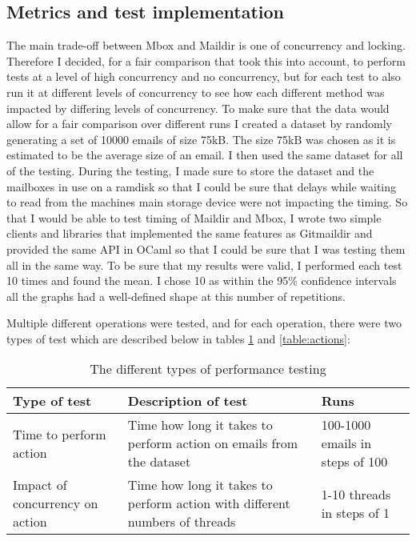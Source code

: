 \subsection{Metrics and test implementation}

The main trade-off between Mbox and Maildir is one of concurrency and locking. Therefore I decided, for a fair comparison that took this into account, to perform tests at a level of high concurrency and no concurrency, but for each test to also run it at different levels of concurrency to see how each different method was impacted by differing levels of concurrency. To make sure that the data would allow for a fair comparison over different runs I created a dataset by randomly generating a set of 10000 emails of size 75kB. The size 75kB was chosen as it is estimated to be the average size of an email\cite{email_size}. I then used the same dataset for all of the testing. During the testing, I made sure to store the dataset and the mailboxes in use on a ramdisk so that I could be sure that delays while waiting to read from the machines main storage device were not impacting the timing. So that I would be able to test timing of Maildir and Mbox, I wrote two simple clients and libraries that implemented the same features as Gitmaildir and provided the same API in OCaml so that I could be sure that I was testing them all in the same way. To be sure that my results were valid, I performed each test 10 times and found the mean. I chose 10 as within the 95\% confidence intervals all the graphs had a well-defined shape at this number of repetitions.

Multiple different operations were tested, and for each operation, there were two types of test which are described below in tables \ref{table:tests} and \ref{table:actions}:

\begin{table}[h]
\footnotesize
\centering
\begin{tabular}{p{3.5cm} p{7.5cm} p{3cm}}
  \toprule
  Type of test & Description of test & Runs \\
  \midrule
  Time to perform action & Time how long it takes to perform action on emails from the dataset & 100-1000 emails in steps of 100 \\
  Impact of concurrency on action & Time how long it takes to perform action with different numbers of threads & 1-10 threads in steps of 1 \\
  \bottomrule
\end{tabular}
\caption{The different types of performance testing}
\label{table:tests}
\end{table}

